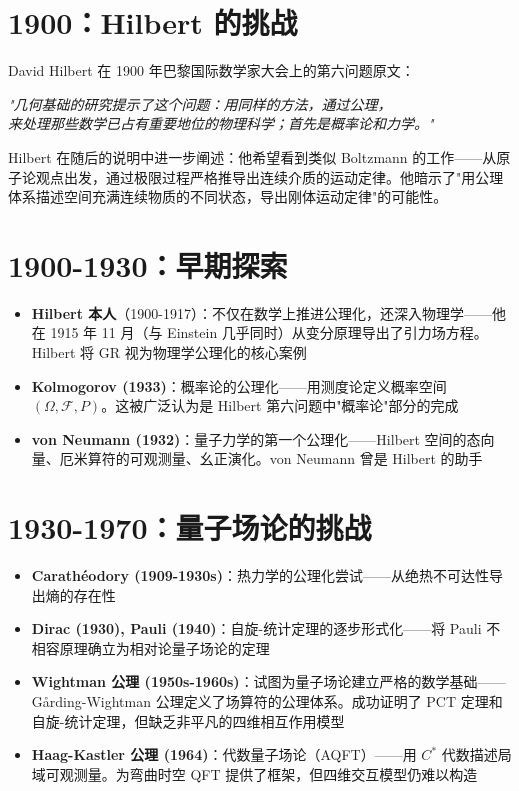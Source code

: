 \documentclass[11pt,a4paper,openany]{book}
\begin{document}
\section*{1900：Hilbert 的挑战}

David Hilbert 在 1900 年巴黎国际数学家大会上的第六问题原文：

\begin{center}
\itshape "几何基础的研究提示了这个问题：用同样的方法，通过公理，\\
来处理那些数学已占有重要地位的物理科学；首先是概率论和力学。"
\end{center}

Hilbert 在随后的说明中进一步阐述：他希望看到类似 Boltzmann 的工作——从原子论观点出发，通过极限过程严格推导出连续介质的运动定律。他暗示了"用公理体系描述空间充满连续物质的不同状态，导出刚体运动定律"的可能性。

\section*{1900-1930：早期探索}

\begin{itemize}
  \item \textbf{Hilbert 本人}（1900-1917）：不仅在数学上推进公理化，还深入物理学——他在 1915 年 11 月（与 Einstein 几乎同时）从变分原理导出了引力场方程。Hilbert 将 GR 视为物理学公理化的核心案例
  \item \textbf{Kolmogorov (1933)}：概率论的公理化——用测度论定义概率空间 $(\Omega, \mathcal{F}, P)$。这被广泛认为是 Hilbert 第六问题中"概率论"部分的完成
  \item \textbf{von Neumann (1932)}：量子力学的第一个公理化——Hilbert 空间的态向量、厄米算符的可观测量、幺正演化。von Neumann 曾是 Hilbert 的助手
\end{itemize}

\section*{1930-1970：量子场论的挑战}

\begin{itemize}
  \item \textbf{Carathéodory (1909-1930s)}：热力学的公理化尝试——从绝热不可达性导出熵的存在性
  \item \textbf{Dirac (1930), Pauli (1940)}：自旋-统计定理的逐步形式化——将 Pauli 不相容原理确立为相对论量子场论的定理
  \item \textbf{Wightman 公理 (1950s-1960s)}：试图为量子场论建立严格的数学基础——Gårding-Wightman 公理定义了场算符的公理体系。成功证明了 PCT 定理和自旋-统计定理，但缺乏非平凡的四维相互作用模型
  \item \textbf{Haag-Kastler 公理 (1964)}：代数量子场论（AQFT）——用 $C^*$ 代数描述局域可观测量。为弯曲时空 QFT 提供了框架，但四维交互模型仍难以构造
\end{itemize}
\end{document}
